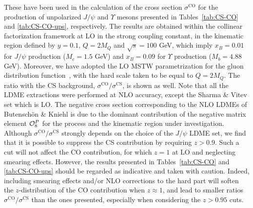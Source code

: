 \documentclass[prd,aps,preprintnumbers,nofootinbib,superscriptaddress]{revtex4}
\newcommand{\xB}{x_{\scriptscriptstyle B}}
\begin{document}
These have been used in the calculation of the cross section $\sigma^\text{CO}$ for the production of unpolarized $J/\psi$ and $\Upsilon$ mesons presented in Tables~\ref{tab:CS-CO} and \ref{tab:CS-CO-ups}, respectively. The results are obtained within the collinear factorization framework at LO in the strong coupling constant, in the kinematic region defined by  $y=0.1$, $Q= 2 M_Q$ and  $\sqrt{s}= 100$ GeV, which imply $\xB = 0.01$ for $J/\psi$ production ($M_c=1.5$ GeV) and $\xB = 0.09$ for $\Upsilon$ production ($M_b = 4.88$ GeV). Moreover, we have adopted the LO MSTW parametrization for the gluon distribution function~\cite{Martin:2009iq}, with the hard scale taken to be equal to $Q=2M_Q$. The ratio with the CS background, $\sigma^\text{CO}/\sigma^\text{CS}$, is shown as well. Note that all the LDME extractions were performed at NLO accuracy, except the Sharma \& Vitev set which is LO. The negative cross section corresponding to the NLO LDMEs of Butensch\"on \& Kniehl is due to the dominant contribution of the negative matrix element ${\cal O}_8^P$  for the process and the kinematic region under investigation. Although $\sigma^\text{CO}/\sigma^\text{CS}$ strongly depends  on the choice of the $J/\psi$ LDME set, we find that it is possible to suppress the CS contribution by requiring $z>0.9$. Such a cut will not affect the CO contribution, for which $z=1$ at LO and neglecting smearing effects. However, the results presented in Tables~\ref{tab:CS-CO} and \ref{tab:CS-CO-ups} should be regarded as indicative and taken with caution. Indeed, including smearing effects and/or NLO corrections to the hard part will soften the $z$-distribution of the CO contribution when $z \approx 1$, and lead to smaller ratios $\sigma^\text{CO}/\sigma^\text{CS}$ than the ones presented, especially when considering the $z>0.95$ cuts.
\end{document}
